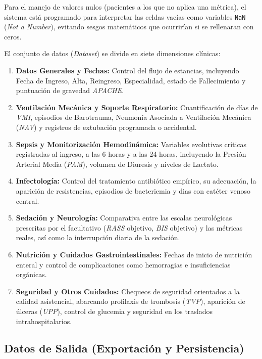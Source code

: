 Para el manejo de valores nulos (pacientes a los que no aplica una métrica), el sistema está programado para interpretar las celdas vacías como variables \texttt{NaN} (\textit{Not a Number}), evitando sesgos matemáticos que ocurrirían si se rellenaran con ceros.

El conjunto de datos (\textit{Dataset}) se divide en siete dimensiones clínicas:

\begin{enumerate}
    \item \textbf{Datos Generales y Fechas:} Control del flujo de estancias, incluyendo Fecha de Ingreso, Alta, Reingreso, Especialidad, estado de Fallecimiento y puntuación de gravedad \textit{APACHE}.
    \item \textbf{Ventilación Mecánica y Soporte Respiratorio:} Cuantificación de días de \textit{VMI}, episodios de Barotrauma, Neumonía Asociada a Ventilación Mecánica (\textit{NAV}) y registros de extubación programada o accidental.
    \item \textbf{Sepsis y Monitorización Hemodinámica:} Variables evolutivas críticas registradas al ingreso, a las 6 horas y a las 24 horas, incluyendo la Presión Arterial Media (\textit{PAM}), volumen de Diuresis y niveles de Lactato.
    \item \textbf{Infectología:} Control del tratamiento antibiótico empírico, su adecuación, la aparición de resistencias, episodios de bacteriemia y dias con catéter venoso central.
    \item \textbf{Sedación y Neurología:} Comparativa entre las escalas neurológicas prescritas por el facultativo (\textit{RASS} objetivo, \textit{BIS} objetivo) y las métricas reales, así como la interrupción diaria de la sedación.
    \item \textbf{Nutrición y Cuidados Gastrointestinales:} Fechas de inicio de nutrición enteral y control de complicaciones como hemorragias e insuficiencias orgánicas.
    \item \textbf{Seguridad y Otros Cuidados:} Chequeos de seguridad orientados a la calidad asistencial, abarcando profilaxis de trombosis (\textit{TVP}), aparición de úlceras (\textit{UPP}), control de glucemia y seguridad en los traslados intrahospitalarios.
\end{enumerate}

\subsection{Datos de Salida (Exportación y Persistencia)}

